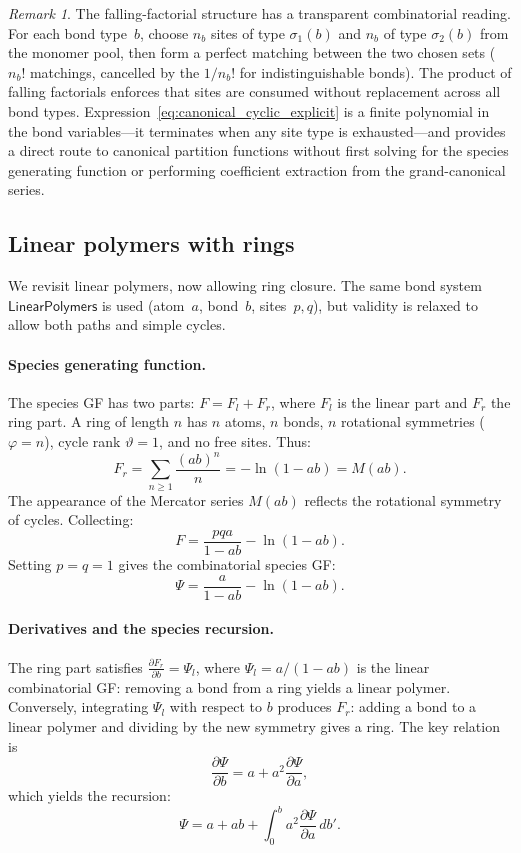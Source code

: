 \documentclass[11pt]{amsart}
\newcommand{\GFspecies}{F}
\newcommand{\GFcomb}{\Psi}
\newcommand{\PDeriv}[2]{\frac{\partial #1}{\partial #2}}
\theoremstyle{definition}
\theoremstyle{plain}
\theoremstyle{remark}
\newtheorem*{remark}{Remark}
\begin{document}
\begin{remark}
The falling-factorial structure has a transparent combinatorial reading.
For each bond type~$b$, choose $n_b$ sites of type $\sigma_1(b)$ and $n_b$ of type $\sigma_2(b)$ from the monomer pool,
then form a perfect matching between the two chosen sets ($n_b!$ matchings, cancelled by the $1/n_b!$ for indistinguishable bonds).
The product of falling factorials enforces that sites are consumed without replacement across all bond types.
Expression~\eqref{eq:canonical_cyclic_explicit} is a finite polynomial in the bond variables---it terminates when any site type is exhausted---and provides a direct route to canonical partition functions without first solving for the species generating function or performing coefficient extraction from the grand-canonical series.
\end{remark}

\subsection{Linear polymers with rings}
\label{sec:cycles_linear}

We revisit linear polymers, now allowing ring closure.
The same bond system $\mathsf{LinearPolymers}$ is used (atom~$a$, bond~$b$, sites~$p,q$), but validity is relaxed to allow both paths and simple cycles.

\paragraph{Species generating function.}
The species GF has two parts: $\GFspecies = \GFspecies_l + \GFspecies_r$, where $\GFspecies_l$ is the linear part and $\GFspecies_r$ the ring part.
A ring of length $n$ has $n$ atoms, $n$ bonds, $n$ rotational symmetries ($\varphi=n$), cycle rank $\vartheta=1$, and no free sites.
Thus:
\[
\GFspecies_r = \sum_{n\ge 1}\frac{(ab)^n}{n} = -\ln(1-ab) = M(ab).
\]
The appearance of the Mercator series $M(ab)$ reflects the rotational symmetry of cycles.
Collecting:
\begin{equation}\label{eq:polymer_with_rings}
\GFspecies = \frac{pqa}{1-ab} - \ln(1-ab).
\end{equation}
Setting $p=q=1$ gives the combinatorial species GF:
\[
\GFcomb = \frac{a}{1-ab} - \ln(1-ab).
\]

\paragraph{Derivatives and the species recursion.}
The ring part satisfies $\PDeriv{\GFspecies_r}{b} = \GFcomb_l$, where $\GFcomb_l = a/(1-ab)$ is the linear combinatorial GF: removing a bond from a ring yields a linear polymer.
Conversely, integrating $\GFcomb_l$ with respect to $b$ produces $\GFspecies_r$: adding a bond to a linear polymer and dividing by the new symmetry gives a ring.
The key relation is
\[
\PDeriv{\GFcomb}{b} = a + a^2\PDeriv{\GFcomb}{a},
\]
which yields the recursion:
\begin{equation}\label{eq:ring_species_recursion}
\GFcomb = a + ab + \int_0^b a^2\PDeriv{\GFcomb}{a}\,db'.
\end{equation}
\end{document}
